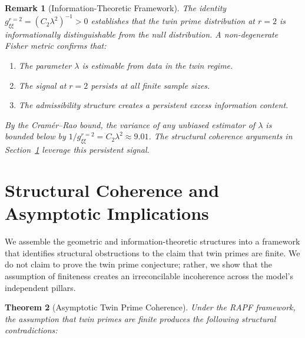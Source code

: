 \documentclass[12pt]{article}
\newtheorem{theorem}{Theorem}[section]
\newtheorem{remark}[theorem]{Remark}
\begin{document}
\begin{remark}[Information-Theoretic Framework]
The identity $g_{\xi\xi}^{r=2} = (C_2\lambda^2)^{-1} > 0$ establishes that the
twin prime distribution at $r=2$ is \textit{informationally distinguishable}
from the null distribution. A non-degenerate Fisher metric confirms that:
\begin{enumerate}
  \item The parameter $\lambda$ is estimable from data in the twin regime.
  \item The signal at $r=2$ persists at all finite sample sizes.
  \item The admissibility structure creates a persistent excess information content.
\end{enumerate}
By the Cram\'er--Rao bound, the variance of any unbiased estimator of $\lambda$
is bounded below by $1/g_{\xi\xi}^{r=2} = C_2\lambda^2 \approx 9.01$. The
structural coherence arguments in Section~\ref{sec:asymptotic_coherence}
leverage this persistent signal.
\end{remark}

\section{Structural Coherence and Asymptotic Implications}
\label{sec:asymptotic_coherence}

We assemble the geometric and information-theoretic structures into a framework
that identifies structural obstructions to the claim that twin primes are finite.
We do not claim to prove the twin prime conjecture; rather, we show that the
assumption of finiteness creates an irreconcilable incoherence across the model's
independent pillars.

\begin{theorem}[Asymptotic Twin Prime Coherence]
Under the RAPF framework, the assumption that twin primes are finite produces
the following structural contradictions:
\end{theorem}
\end{document}
